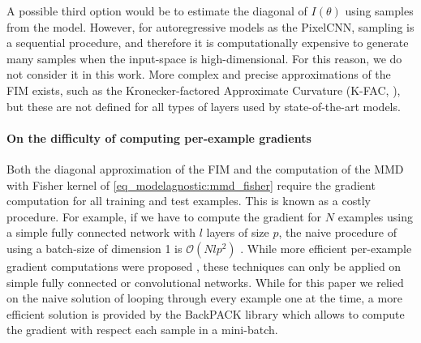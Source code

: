 {A possible third option would be to estimate the diagonal of $I(\theta)$ using samples from the model. However, for autoregressive models as the PixelCNN, sampling is a sequential procedure, and therefore it is computationally expensive to generate many samples when the input-space is high-dimensional. For this reason, we do not consider it in this work. More complex and precise approximations of the FIM exists, such as the Kronecker-factored Approximate Curvature (K-FAC, \citealp{martens_optimizing_2015}), but these are not defined for all types of layers used by state-of-the-art models.

\paragraph{On the difficulty of computing per-example gradients} Both the diagonal approximation of the FIM and the computation of the MMD with Fisher kernel of \cref{eq_modelagnostic:mmd_fisher} require the gradient computation for all training and test examples. This is known as a costly procedure. For example, if we have to compute the gradient for $N$ examples using a simple fully connected network with $l$ layers of size $p$, the naive procedure of using a batch-size of dimension 1 is $\mathcal{O}(Nlp^2)$ \parencite{goodfellow_efficient_2015}. While more efficient per-example gradient computations were proposed \parencite{goodfellow_efficient_2015, rochette_efficient_2019}, these techniques can only be applied on simple fully connected or convolutional networks. While for this paper we relied on the naive solution of looping through every example one at the time, a more efficient solution is provided by the BackPACK library \parencite{dangel_backpack_2020} which allows to compute the gradient with respect each sample in a mini-batch. 

}
